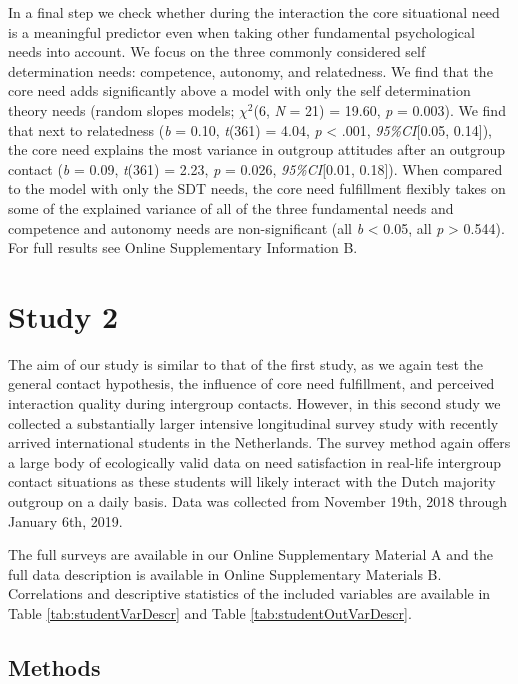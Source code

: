 In a final step we check whether during the interaction the core
situational need is a meaningful predictor even when taking other
fundamental psychological needs into account. We focus on the three
commonly considered self determination needs: competence, autonomy, and
relatedness. We find that the core need adds significantly above a model
with only the self determination theory needs (random slopes models;
\(\chi^2\)(6, \textit{N} = 21) = 19.60, \textit{p} = 0.003). We find
that next to relatedness (\textit{b} = 0.10, \textit{t}(361) = 4.04,
\textit{p} \textless{} .001, \textit{95\%CI}{[}0.05, 0.14{]}), the core
need explains the most variance in outgroup attitudes after an outgroup
contact (\textit{b} = 0.09, \textit{t}(361) = 2.23, \textit{p} = 0.026,
\textit{95\%CI}{[}0.01, 0.18{]}). When compared to the model with only
the SDT needs, the core need fulfillment flexibly takes on some of the
explained variance of all of the three fundamental needs and competence
and autonomy needs are non-significant (all \textit{b} \textless{} 0.05,
all \textit{p} \textgreater{} 0.544). For full results see Online
Supplementary Information B.

\section{Study 2}

The aim of our study is similar to that of the first study, as we again
test the general contact hypothesis, the influence of core need
fulfillment, and perceived interaction quality during intergroup
contacts. However, in this second study we collected a substantially
larger intensive longitudinal survey study with recently arrived
international students in the Netherlands. The survey method again
offers a large body of ecologically valid data on need satisfaction in
real-life intergroup contact situations as these students will likely
interact with the Dutch majority outgroup on a daily basis. Data was
collected from November 19th, 2018 through January 6th, 2019.

The full surveys are available in our Online Supplementary Material A
and the full data description is available in Online Supplementary
Materials B. Correlations and descriptive statistics of the included
variables are available in Table \ref{tab:studentVarDescr} and Table
\ref{tab:studentOutVarDescr}.

\subsection{Methods}

